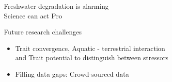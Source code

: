 \documentclass[10pt, compress]{beamer}
\begin{document}

\begin{frame}{Freshwater degradation is alarming \protect\\ Science can act Pro}
\begin{center}
\end{center}
\end{frame}


\begin{frame}{Future research challenges}
\begin{itemize}
\item Trait convergence, Aquatic - terrestrial interaction \\ and Trait potential to distinguish between stressors\\
\vspace{0.5cm}
\item Filling data gaps: Crowd-sourced data
\end{itemize}
\end{frame}

\end{document}
